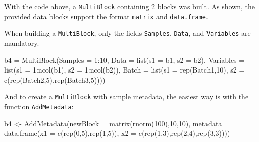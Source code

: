 \documentclass[
]{book}
\newenvironment{Shaded}{\begin{snugshade}}{\end{snugshade}}
\newcommand{\AttributeTok}[1]{\textcolor[rgb]{0.77,0.63,0.00}{#1}}
\newcommand{\DecValTok}[1]{\textcolor[rgb]{0.00,0.00,0.81}{#1}}
\newcommand{\FunctionTok}[1]{\textcolor[rgb]{0.00,0.00,0.00}{#1}}
\newcommand{\NormalTok}[1]{#1}
\newcommand{\OtherTok}[1]{\textcolor[rgb]{0.56,0.35,0.01}{#1}}
\newcommand{\SpecialCharTok}[1]{\textcolor[rgb]{0.00,0.00,0.00}{#1}}
\newcommand{\StringTok}[1]{\textcolor[rgb]{0.31,0.60,0.02}{#1}}
\begin{document}
With the code above, a \texttt{MultiBlock} containing 2 blocks was built. As shown, the
provided data blocks support the format \texttt{matrix} and \texttt{data.frame}.

When building a \texttt{MultiBlock}, only the fields \texttt{Samples}, \texttt{Data}, and \texttt{Variables}
are mandatory.

\begin{Shaded}
\begin{Highlighting}[]
\NormalTok{b4 }\OtherTok{=} \FunctionTok{MultiBlock}\NormalTok{(}\AttributeTok{Samples =} \DecValTok{1}\SpecialCharTok{:}\DecValTok{10}\NormalTok{,}
                \AttributeTok{Data =} \FunctionTok{list}\NormalTok{(}\AttributeTok{s1 =}\NormalTok{ b1, }\AttributeTok{s2 =}\NormalTok{ b2),}
                \AttributeTok{Variables =} \FunctionTok{list}\NormalTok{(}\AttributeTok{s1 =} \DecValTok{1}\SpecialCharTok{:}\FunctionTok{ncol}\NormalTok{(b1),}
                                 \AttributeTok{s2 =} \DecValTok{1}\SpecialCharTok{:}\FunctionTok{ncol}\NormalTok{(b2)),}
                \AttributeTok{Batch =} \FunctionTok{list}\NormalTok{(}\AttributeTok{s1 =} \FunctionTok{rep}\NormalTok{(}\StringTok{\textquotesingle{}Batch1\textquotesingle{}}\NormalTok{,}\DecValTok{10}\NormalTok{),}
                             \AttributeTok{s2 =} \FunctionTok{c}\NormalTok{(}\FunctionTok{rep}\NormalTok{(}\StringTok{\textquotesingle{}Batch2\textquotesingle{}}\NormalTok{,}\DecValTok{5}\NormalTok{),}\FunctionTok{rep}\NormalTok{(}\StringTok{\textquotesingle{}Batch3\textquotesingle{}}\NormalTok{,}\DecValTok{5}\NormalTok{))))}
\end{Highlighting}
\end{Shaded}

And to create a \texttt{MultiBlock} with sample metadata, the easiest way is with the
function \texttt{AddMetadata}:

\begin{Shaded}
\begin{Highlighting}[]
\NormalTok{b4 }\OtherTok{\textless{}{-}} \FunctionTok{AddMetadata}\NormalTok{(}\AttributeTok{newBlock =} \FunctionTok{matrix}\NormalTok{(}\FunctionTok{rnorm}\NormalTok{(}\DecValTok{100}\NormalTok{),}\DecValTok{10}\NormalTok{,}\DecValTok{10}\NormalTok{),}
                  \AttributeTok{metadata =} \FunctionTok{data.frame}\NormalTok{(}\AttributeTok{x1 =} \FunctionTok{c}\NormalTok{(}\FunctionTok{rep}\NormalTok{(}\DecValTok{0}\NormalTok{,}\DecValTok{5}\NormalTok{),}\FunctionTok{rep}\NormalTok{(}\DecValTok{1}\NormalTok{,}\DecValTok{5}\NormalTok{)),}
                                        \AttributeTok{x2 =} \FunctionTok{c}\NormalTok{(}\FunctionTok{rep}\NormalTok{(}\DecValTok{1}\NormalTok{,}\DecValTok{3}\NormalTok{),}\FunctionTok{rep}\NormalTok{(}\DecValTok{2}\NormalTok{,}\DecValTok{4}\NormalTok{),}\FunctionTok{rep}\NormalTok{(}\DecValTok{3}\NormalTok{,}\DecValTok{3}\NormalTok{))))}
\end{Highlighting}
\end{Shaded}
\end{document}

